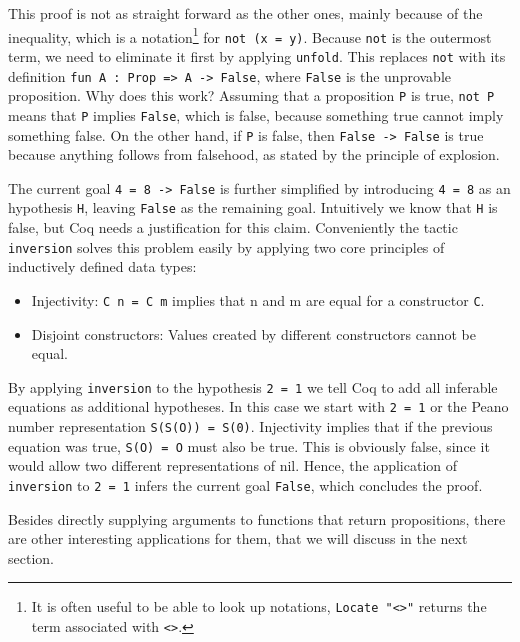 \documentclass[fleqn, abstract=on]{scrreprt}
\newcommand{\todo}[1]{\marginpar{\textbf{TODO:} #1}}
\newcommand{\coqinline}[1]{\texttt{#1}}
\begin{document}
This proof is not as straight forward as the other ones, mainly because of the inequality, which is a notation\footnote{It is often useful to be able to look up notations, \coqinline{Locate "<>"} returns the term associated with \coqinline{<>}.} for \coqinline{not (x = y)}. Because \coqinline{not} is the outermost term, we need to eliminate it first by applying \coqinline{unfold}. This replaces \coqinline{not} with its definition \coqinline{fun A : Prop => A -> False}, where \coqinline{False} is the unprovable proposition. Why does this work?
Assuming that a proposition \coqinline{P} is true, \coqinline{not P} means that \coqinline{P} implies \coqinline{False}, which is false, because something true cannot imply something false. On the other hand, if \coqinline{P} is false, then \coqinline{False -> False} is true because anything follows from falsehood, as stated by the principle of explosion. \todo{verweis?}
\par
The current goal \coqinline{4 = 8 -> False} is further simplified by introducing \coqinline{4 = 8} as an hypothesis \coqinline{H}, leaving \coqinline{False} as the remaining goal. Intuitively we know that \coqinline{H} is false, but Coq needs a justification for this claim.
Conveniently the tactic \coqinline{inversion} solves this problem easily by applying two core principles of inductively defined data types:
\begin{itemize}
	\item Injectivity: \coqinline{C n = C m} implies that n and m are equal for a constructor \coqinline{C}.
	\item Disjoint constructors: Values created by different constructors cannot be equal.
\end{itemize}
By applying \coqinline{inversion} to the hypothesis \coqinline{2 = 1} we tell Coq to add all inferable equations as additional hypotheses. In this case we start with \coqinline{2 = 1} or the Peano number representation \coqinline{S(S(O)) = S(0)}. Injectivity implies that if the previous equation was true, \coqinline{S(O) = O} must also be true. This is obviously false, since it would allow two different representations of nil. Hence, the application of \coqinline{inversion} to \coqinline{2 = 1} infers the current goal \coqinline{False}, which concludes the proof.

Besides directly supplying arguments to functions that return propositions, there are other interesting applications for them, that we will discuss in the next section.
\end{document}
